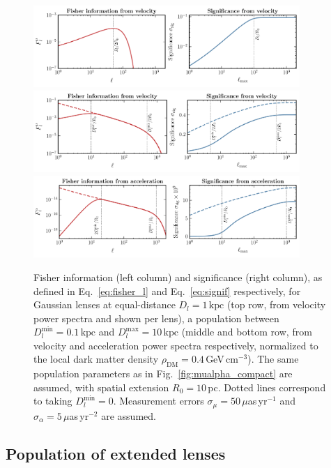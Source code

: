 \documentclass[prd,aps,twocolumn,nofootinbib,superscriptaddress,preprintnumbers,balancelastpage,longbibliography,floatfix]{revtex4-1}
\begin{document}
\begin{figure}[htbp]
\centering
\includegraphics[width=0.9\textwidth]{plots/fisher_mu_single.pdf}
\includegraphics[width=0.9\textwidth]{plots/fisher_mu.pdf}
\includegraphics[width=0.9\textwidth]{plots/fisher_alpha.pdf}
\caption{Fisher information (left column) and significance (right column), as defined in Eq.~\eqref{eq:fisher_l} and Eq.~\eqref{eq:signif} respectively, for Gaussian lenses at equal-distance $D_l=1\,\mathrm{kpc}$ (top row, from velocity power spectra and shown per lens), a population between $D_{l}^{\mathrm{min}}=0.1\,\mathrm{kpc}$ and $D_{l}^{\mathrm{max}}=10\,\mathrm{kpc}$ (middle and bottom row, from velocity and acceleration power spectra respectively, normalized to the local dark matter density $\rho_\mathrm{DM}=0.4$\,GeV\,cm$^{-3}$). The same population parameters as in Fig.~\ref{fig:mualpha_compact} are assumed, with spatial extension $R_0=10$\,pc. Dotted lines correspond to taking $D_l^\mathrm{min}=0$. Measurement errors $\sigma_\mu=50\,\mu$as\,yr$^{-1}$ and $\sigma_\alpha=5\,\mu$as\,yr$^{-2}$ are assumed. } 
\label{fig:fisher_sig}
\end{figure}

\subsection{Population of extended lenses}\label{app:aristotle}
\end{document}

